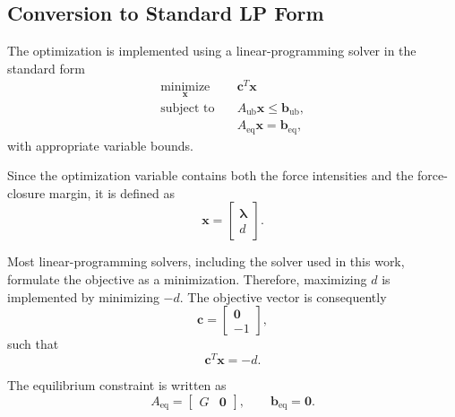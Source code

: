 \subsection{Conversion to Standard LP Form}

The optimization is implemented using a linear-programming solver in the
standard form
\begin{equation}
\begin{aligned}
    \underset{\boldsymbol{x}}{\operatorname{minimize}}
    \quad & \boldsymbol{c}^{T}\boldsymbol{x}\\
    \text{subject to}
    \quad & A_{\mathrm{ub}}\boldsymbol{x}
        \leq \boldsymbol{b}_{\mathrm{ub}},\\
    & A_{\mathrm{eq}}\boldsymbol{x}
        = \boldsymbol{b}_{\mathrm{eq}},
\end{aligned}
\end{equation}
with appropriate variable bounds.

Since the optimization variable contains both the force intensities and the
force-closure margin, it is defined as
\begin{equation}
    \boldsymbol{x}
    =
    \begin{bmatrix}
        \boldsymbol{\lambda}\\
        d
    \end{bmatrix}.
\end{equation}

Most linear-programming solvers, including the solver used in this work,
formulate the objective as a minimization. Therefore, maximizing $d$ is
implemented by minimizing $-d$. The objective vector is consequently
\begin{equation}
    \boldsymbol{c}
    =
    \begin{bmatrix}
        \boldsymbol{0}\\
        -1
    \end{bmatrix},
\end{equation}
such that
\begin{equation}
    \boldsymbol{c}^{T}\boldsymbol{x}=-d.
\end{equation}

The equilibrium constraint is written as
\begin{equation}
    A_{\mathrm{eq}}
    =
    \begin{bmatrix}
        G & \boldsymbol{0}
    \end{bmatrix},
    \qquad
    \boldsymbol{b}_{\mathrm{eq}}
    =
    \boldsymbol{0}.
\end{equation}

